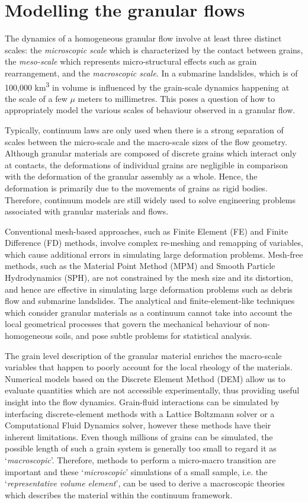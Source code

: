 \section{Modelling the granular flows}

The dynamics of a homogeneous granular flow involve at least three distinct 
scales: the \textit{microscopic scale} which is characterized by the contact 
between grains, the \textit{meso-scale} which represents micro-structural 
effects such as grain rearrangement, and the \textit{macroscopic scale}. In a 
submarine landslides, which is of 100,000 \si{\km\cubed} in volume is 
influenced by the grain-scale dynamics happening at the scale of 
a few $\mu$ meters to millimetres. This poses a question of how to 
appropriately model the various scales of behaviour observed in a granular 
flow. 

Typically, continuum laws are only used when there is a strong separation of 
scales between the micro-scale and the macro-scale sizes of the flow geometry. 
Although granular materials are composed of discrete grains which interact only 
at contacts, the deformations of individual grains are negligible in comparison 
with the deformation of the granular assembly as a whole. Hence, the 
deformation is primarily due to the movements of grains as rigid bodies. 
Therefore, continuum models are still widely used to solve engineering problems 
associated with granular materials and flows. 

Conventional mesh-based approaches, such as Finite Element (FE) and Finite 
Difference (FD) methods, involve complex re-meshing and remapping of variables, 
which cause additional errors in simulating large deformation problems. 
Mesh-free methods, such as the Material Point Method (MPM) and Smooth Particle 
Hydrodynamics (SPH), are not constrained by the mesh size and its distortion, 
and hence are effective in simulating large deformation problems such as debris 
flow and submarine landslides. The analytical and finite-element-like 
techniques which consider granular materials as a continuum cannot take into 
account the local geometrical processes that govern the mechanical behaviour of 
non-homogeneous soils, and pose subtle problems for statistical analysis. 

The grain level description of the granular material enriches the 
macro-scale variables that happen to poorly account for the local rheology of 
the materials. Numerical models based on the Discrete Element Method (DEM) 
allow us to evaluate quantities which are not accessible experimentally, thus 
providing useful insight into the flow dynamics. Grain-fluid interactions can 
be simulated by interfacing discrete-element methods with a Lattice 
Boltzmann solver or a Computational Fluid Dynamics solver, however these 
methods have their inherent limitations. Even though millions of grains can be 
simulated, the possible length of such a grain system is generally too small to 
regard it as `\textit{macroscopic}'. Therefore, methods to perform a 
micro-macro transition are important and these `\textit{microscopic}' 
simulations of a small sample, i.e. the `\textit{representative volume 
element}', can be used to derive a macroscopic theories which describes the 
material within the continuum framework. 


